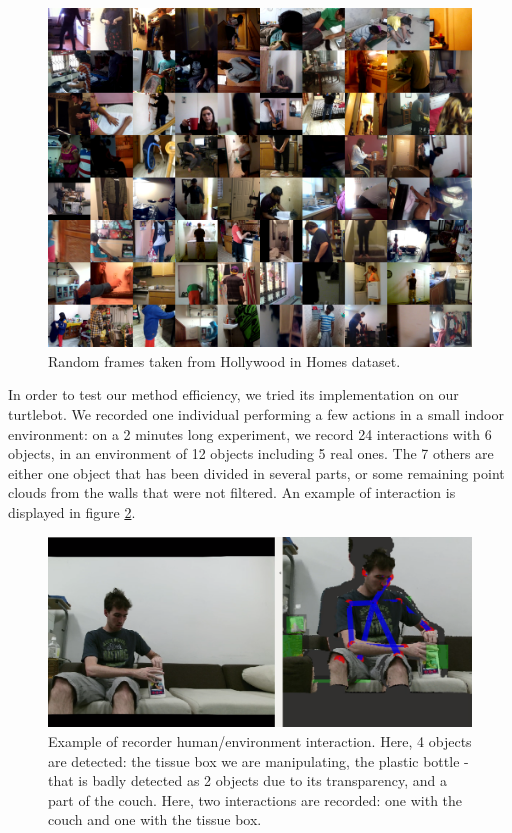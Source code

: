 \begin{figure}[htp]
\centering
\includegraphics[width=120mm, keepaspectratio]{images/HiH.png}
\caption{Random frames taken from Hollywood in Homes dataset.}
\label{fig:HiH}
\end{figure}

In order to test our method efficiency, we tried its implementation on our turtlebot. We recorded one individual performing a few actions in a small indoor environment: on a 2 minutes long experiment, we record 24 interactions with 6 objects, in an environment of 12 objects including 5 real ones. The 7 others are either one object that has been divided in several parts, or some remaining point clouds from the walls that were not filtered. An example of interaction is displayed in figure \ref{fig:interaction}.

\begin{figure}[htp]
\centering
\includegraphics[width=150mm, keepaspectratio]{images/interaction_example.png}
\caption[Example of recorder human/environment interaction]{Example of recorder human/environment interaction. Here, 4 objects are detected: the tissue box we are manipulating, the plastic bottle - that is badly detected as 2 objects due to its transparency, and a part of the couch. Here, two interactions are recorded: one with the couch and one with the tissue box.}
\label{fig:interaction}
\end{figure}

